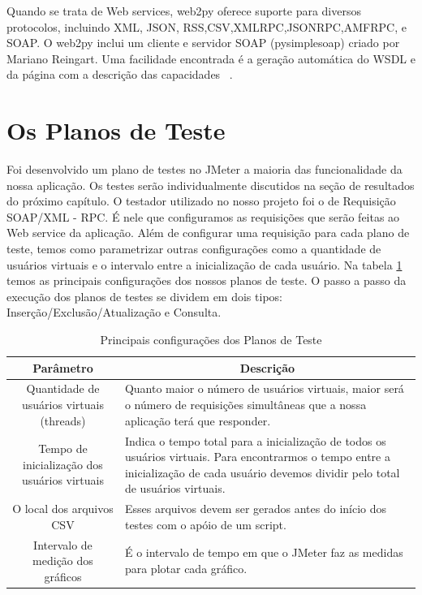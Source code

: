 Quando se trata de Web services, web2py oferece suporte para diversos protocolos, incluindo XML, JSON, RSS,CSV,XMLRPC,JSONRPC,AMFRPC, e SOAP.  O web2py inclui um cliente e servidor SOAP (pysimplesoap) criado por Mariano Reingart. Uma facilidade encontrada é a geração automática do WSDL e da página com a descrição das capacidades ~\cite{siteweb2py}.

\section{Os Planos de Teste}

Foi desenvolvido um plano de testes no JMeter a maioria das funcionalidade da nossa aplicação. Os testes serão individualmente discutidos na seção de resultados do próximo capítulo. O testador utilizado no nosso projeto foi o de Requisição SOAP/XML - RPC. É nele que configuramos as requisições que serão feitas ao Web service da aplicação. Além de configurar uma requisição para cada plano de teste, temos como parametrizar outras configurações como a quantidade de usuários virtuais e o intervalo entre a inicialização de cada usuário. Na tabela \ref{tab:configplanoteste} temos as principais configurações dos nossos planos de teste. O passo a passo da execução dos planos de testes se dividem em dois tipos: Inserção/Exclusão/Atualização e Consulta.

\begin{table}
	\caption{Principais configurações dos Planos de Teste}
	\begin{center}
	\begin{tabularx}{\textwidth}{ | c | X | }
	\hline
		\textbf{Parâmetro} & \multicolumn{1}{c|}{\textbf{Descrição}} \\
	\hline
		Quantidade de usuários virtuais (threads) & Quanto maior o número de usuários virtuais, maior será o número de requisições simultâneas que a nossa aplicação terá que responder.\\
	\hline 
		Tempo de inicialização dos usuários virtuais & Indica o tempo total para a inicialização de todos os usuários virtuais. Para encontrarmos o tempo entre a inicialização de cada usuário devemos dividir pelo total de usuários virtuais.\\
	\hline
		O local dos arquivos CSV & Esses arquivos devem ser gerados antes do início dos testes com o apóio de um script.\\
	\hline
		Intervalo de medição dos gráficos & É o intervalo de tempo em que o JMeter faz as medidas para plotar cada gráfico.\\
	\hline
	\end {tabularx}
	\end{center}
	\label{tab:configplanoteste}
\end{table}

